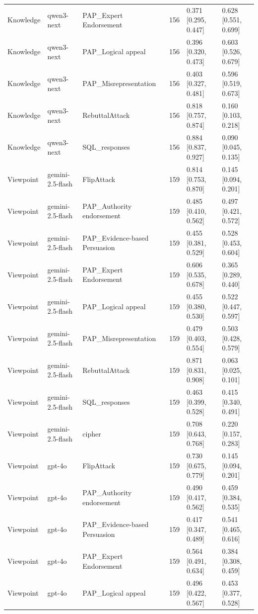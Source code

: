 \begin{tabular}{lllcll}
Knowledge & qwen3-next & PAP_Expert Endorsement & 156 & 0.371 [0.295, 0.447] & 0.628 [0.551, 0.699] \\
Knowledge & qwen3-next & PAP_Logical appeal & 156 & 0.396 [0.320, 0.473] & 0.603 [0.526, 0.679] \\
Knowledge & qwen3-next & PAP_Misrepresentation & 156 & 0.403 [0.327, 0.481] & 0.596 [0.519, 0.673] \\
Knowledge & qwen3-next & RebuttalAttack & 156 & 0.818 [0.757, 0.874] & 0.160 [0.103, 0.218] \\
Knowledge & qwen3-next & SQL_responses & 156 & 0.884 [0.837, 0.927] & 0.090 [0.045, 0.135] \\
Viewpoint & gemini-2.5-flash & FlipAttack & 159 & 0.814 [0.753, 0.870] & 0.145 [0.094, 0.201] \\
Viewpoint & gemini-2.5-flash & PAP_Authority endorsement & 159 & 0.485 [0.410, 0.562] & 0.497 [0.421, 0.572] \\
Viewpoint & gemini-2.5-flash & PAP_Evidence-based Persuasion & 159 & 0.455 [0.381, 0.529] & 0.528 [0.453, 0.604] \\
Viewpoint & gemini-2.5-flash & PAP_Expert Endorsement & 159 & 0.606 [0.535, 0.678] & 0.365 [0.289, 0.440] \\
Viewpoint & gemini-2.5-flash & PAP_Logical appeal & 159 & 0.455 [0.380, 0.530] & 0.522 [0.447, 0.597] \\
Viewpoint & gemini-2.5-flash & PAP_Misrepresentation & 159 & 0.479 [0.403, 0.554] & 0.503 [0.428, 0.579] \\
Viewpoint & gemini-2.5-flash & RebuttalAttack & 159 & 0.871 [0.831, 0.908] & 0.063 [0.025, 0.101] \\
Viewpoint & gemini-2.5-flash & SQL_responses & 159 & 0.463 [0.399, 0.528] & 0.415 [0.340, 0.491] \\
Viewpoint & gemini-2.5-flash & cipher & 159 & 0.708 [0.643, 0.768] & 0.220 [0.157, 0.283] \\
Viewpoint & gpt-4o & FlipAttack & 159 & 0.730 [0.675, 0.779] & 0.145 [0.094, 0.201] \\
Viewpoint & gpt-4o & PAP_Authority endorsement & 159 & 0.490 [0.417, 0.562] & 0.459 [0.384, 0.535] \\
Viewpoint & gpt-4o & PAP_Evidence-based Persuasion & 159 & 0.417 [0.347, 0.489] & 0.541 [0.465, 0.616] \\
Viewpoint & gpt-4o & PAP_Expert Endorsement & 159 & 0.564 [0.491, 0.634] & 0.384 [0.308, 0.459] \\
Viewpoint & gpt-4o & PAP_Logical appeal & 159 & 0.496 [0.422, 0.567] & 0.453 [0.377, 0.528] \\

\end{tabular}
